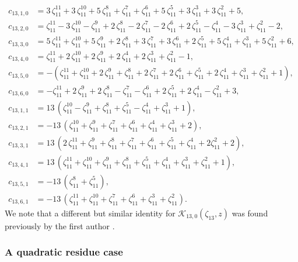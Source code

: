 \documentclass[12pt]{amsart}
\theoremstyle{definition}
\theoremstyle{remark}
\numberwithin{equation}{section}
\begin{document}
\begin{align*}
c_{13,1,0} &=  3\, \zeta_{11}^{11}+3\, \zeta_{11}^{10}+5\, \zeta_{11}^{8}+\zeta_{11}^{7}+\zeta_{11}^{6}+5\, \zeta_{11}^{5}+3\, \zeta_{11}^{3}+3\, \zeta_{11}^{2}+5,
\\
c_{13,2,0} &= \zeta_{11}^{11}-3\, \zeta_{11}^{10}-\zeta_{11}^{9}+2\, \zeta_{11}^{8}-2\, \zeta_{11}^{7}-2\, \zeta_{11}^{6}+2\, \zeta_{11}^{5}-\zeta_{11}^{4}-3\, \zeta_{11}^{3}+\zeta_{11}^{2}-2,
\\
c_{13,3,0} &= 5\, \zeta_{11}^{11}+\zeta_{11}^{10}+5\, \zeta_{11}^{9}+2\, \zeta_{11}^{8}+3\, \zeta_{11}^{7}+3\, \zeta_{11}^{6}+2\, \zeta_{11}^{5}+5\, \zeta_{11}^{4}+\zeta_{11}^{3}+5\, \zeta_{11}^{2}+6,
\\
c_{13,4,0} &= \zeta_{11}^{11}+2\, \zeta_{11}^{10}+2\, \zeta_{11}^{9}+2\, \zeta_{11}^{4}+2\, \zeta_{11}^{3}+\zeta_{11}^{2}-1,
\\
c_{13,5,0} &= -(\zeta_{11}^{11}+\zeta_{11}^{10}+2\, \zeta_{11}^{9}+\zeta_{11}^{8}+2\, \zeta_{11}^{7}+2\, \zeta_{11}^{6}+\zeta_{11}^{5}+2\, \zeta_{11}^{4}+\zeta_{11}^{3}+\zeta_{11}^{2}+1),
\\
c_{13,6,0} &= -\zeta_{11}^{11}+2\, \zeta_{11}^{9}+2\, \zeta_{11}^{8}-\zeta_{11}^{7}-\zeta_{11}^{6}+2\, \zeta_{11}^{5}+2\, \zeta_{11}^{4}-\zeta_{11}^{2}+3,
\\
c_{13,1,1} &=  13\, (\zeta_{11}^{10}-\zeta_{11}^{9}+ \zeta_{11}^{8}+ \zeta_{11}^{5}-\zeta_{11}^{4}+\zeta_{11}^{3}+1),
\\
c_{13,2,1} &=  -13\, \left(\zeta_{11}^{10}+\zeta_{11}^{9}+\zeta_{11}^{7}+\zeta_{11}^{6}+\zeta_{11}^{4}+\zeta_{11}^{3}+2\right),
\\
c_{13,3,1} &= 13\, \left(2\, \zeta_{11}^{11}+\zeta_{11}^{9}+\zeta_{11}^{8}+\zeta_{11}^{7}+\zeta_{11}^{6}+\zeta_{11}^{5}+\zeta_{11}^{4}+2 \zeta_{11}^{2}+2\right),
\\
c_{13,4,1} &= 13\, \left(\zeta_{11}^{11}+\zeta_{11}^{10}+\zeta_{11}^{9}+\zeta_{11}^{8}+\zeta_{11}^{5}+\zeta_{11}^{4}+\zeta_{11}^{3}+\zeta_{11}^{2}+1\right),
\\
c_{13,5,1} &= -13\, \left(\zeta_{11}^{8}+\zeta_{11}^{5}\right),
\\
c_{13,6,1} &= -13\, (\zeta_{11}^{11} + \zeta_{11}^{10} + \zeta_{11}^7 + \zeta_{11}^6 + \zeta_{11}^3 + \zeta_{11}^2).
\end{align*}
We note that a different but similar identity for 
$\mathcal{K}_{13,0}(\zeta_{13},z)$ was found previously by the first
author \cite[Section 6.5]{Ga19a}. 

\subsubsection{\textbf{A quadratic residue case}}
\end{document}
